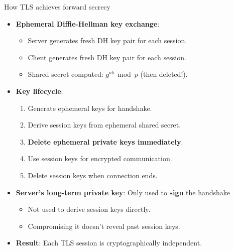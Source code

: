 \ifdefined\PRESENTATION\else\PassOptionsToClass{handout}{beamer}\fi\documentclass[aspectratio=169, lualatex]{beamer}
\begin{document}
\begin{frame}{How TLS achieves forward secrecy}
	\begin{itemize}[<+->]
		\item \textbf{Ephemeral Diffie-Hellman key exchange}:
		      \begin{itemize}
			      \item Server generates fresh DH key pair for each session.
			      \item Client generates fresh DH key pair for each session.
			      \item Shared secret computed: $g^{ab} \bmod p$ (then deleted!).
		      \end{itemize}
		\item \textbf{Key lifecycle}:
		      \begin{enumerate}
			      \item Generate ephemeral keys for handshake.
			      \item Derive session keys from ephemeral shared secret.
			      \item \textbf{Delete ephemeral private keys immediately}.
			      \item Use session keys for encrypted communication.
			      \item Delete session keys when connection ends.
		      \end{enumerate}
		\item \textbf{Server's long-term private key}: Only used to \textbf{sign} the handshake
		      \begin{itemize}
			      \item Not used to derive session keys directly.
			      \item Compromising it doesn't reveal past session keys.
		      \end{itemize}
		\item \textbf{Result}: Each TLS session is cryptographically independent.
	\end{itemize}
\end{frame}
\end{document}

